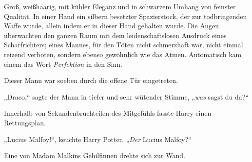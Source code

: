Groß, weißhaarig, mit kühler Eleganz und in schwarzem Umhang von feinster Qualität. In einer Hand ein silbern besetzter Spazierstock, der zur todbringenden Waffe wurde, allein indem er in dieser Hand gehalten wurde. Die Augen überwachten den ganzen Raum mit dem leidenschaftslosen Ausdruck eines Scharfrichters; eines Mannes, für den Töten nicht schmerzhaft war, nicht einmal reizend verboten, sondern ebenso gewöhnlich wie das Atmen. Automatisch kam einem das Wort \emph{Perfektion} in den Sinn.

Dieser Mann war soeben durch die offene Tür eingetreten.

„Draco,“ sagte der Mann in tiefer und sehr wütender Stimme, „\emph{was} sagst du da?“

Innerhalb von Sekundenbruchteilen des Mitgefühls fasste Harry einen Rettungsplan.

„Lucius Malfoy!“, keuchte Harry Potter. „\emph{Der} Lucius Malfoy?“

Eine von Madam Malkins Gehilfinnen drehte sich zur Wand.

